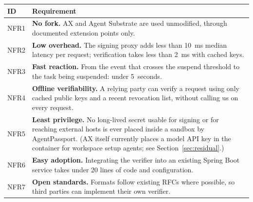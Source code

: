 \begin{center}
\small
\begin{tabularx}{\linewidth}{@{}lY@{}}
\toprule
\textbf{ID} & \textbf{Requirement}\\
\midrule
NFR1 & \textbf{No fork.} AX and Agent Substrate are used unmodified, through documented extension points only.\\
NFR2 & \textbf{Low overhead.} The signing proxy adds less than 10~ms median latency per request; verification takes less than 2~ms with cached keys.\\
NFR3 & \textbf{Fast reaction.} From the event that crosses the suspend threshold to the task being suspended: under 5~seconds.\\
NFR4 & \textbf{Offline verifiability.} A relying party can verify a request using only cached public keys and a recent revocation list, without calling us on every request.\\
NFR5 & \textbf{Least privilege.} No long-lived secret usable for signing or for reaching external hosts is ever placed inside a sandbox by AgentPassport. (AX itself currently places a model API key in the container for workspace setup agents; see Section~\ref{sec:residual}.)\\
NFR6 & \textbf{Easy adoption.} Integrating the verifier into an existing Spring Boot service takes under 20 lines of code and configuration.\\
NFR7 & \textbf{Open standards.} Formats follow existing RFCs where possible, so third parties can implement their own verifier.\\
\bottomrule
\end{tabularx}
\end{center}
